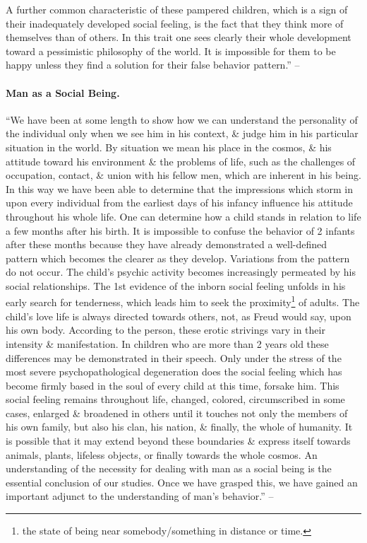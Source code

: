 \documentclass{article}
\begin{document}
A further common characteristic of these pampered children, which is a sign of their inadequately developed social feeling, is the fact that they think more of themselves than of others. In this trait one sees clearly their whole development toward a pessimistic philosophy of the world. It is impossible for them to be happy unless they find a solution for their false behavior pattern.'' -- \cite[pp. 36--42]{Adler_human_nature}

\paragraph{Man as a Social Being.} ``We have been at some length to show how we can understand the personality of the individual only when we see him in his context, \& judge him in his particular situation in the world. By situation we mean his place in the cosmos, \& his attitude toward his environment \& the problems of life, such as the challenges of occupation, contact, \& union with his fellow men, which are inherent in his being. In this way we have been able to determine that the impressions which storm in upon every individual from the earliest days of his infancy influence his attitude throughout his whole life. One can determine how a child stands in relation to life a few months after his birth. It is impossible to confuse the behavior of 2 infants after these months because they have already demonstrated a well-defined pattern which becomes the clearer as they develop. Variations from the pattern do not occur. The child's psychic activity becomes increasingly permeated by his social relationships. The 1st evidence of the inborn social feeling unfolds in his early search for tenderness, which leads him to seek the proximity\footnote{the state of being near somebody/something in distance or time.} of adults. The child's love life is always directed towards others, not, as Freud would say, upon his own body. According to the person, these erotic strivings vary in their intensity \& manifestation. In children who are more than 2 years old these differences may be demonstrated in their speech. Only under the stress of the most severe psychopathological degeneration does the social feeling which has become firmly based in the soul of every child at this time, forsake him. This social feeling remains throughout life, changed, colored, circumscribed in some cases, enlarged \& broadened in others until it touches not only the members of his own family, but also his clan, his nation, \& finally, the whole of humanity. It is possible that it may extend beyond these boundaries \& express itself towards animals, plants, lifeless objects, or finally towards the whole cosmos. An understanding of the necessity for dealing with man as a social being is the essential conclusion of our studies. Once we have grasped this, we have gained an important adjunct to the understanding of man's behavior.'' -- \cite[pp. 42--43]{Adler_human_nature}
\end{document}
